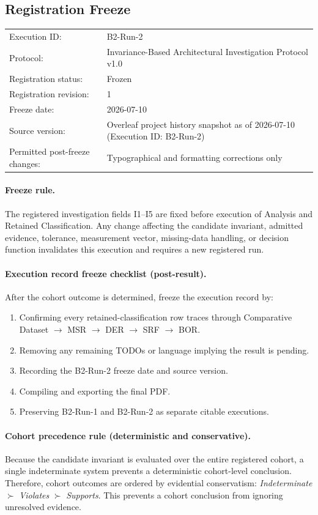 \subsection{Registration Freeze}
\label{sec:registration-freeze}
\begin{tabular}{@{}ll@{}}
\toprule
Execution ID: & B2-Run-2\\
Protocol: & Invariance-Based Architectural Investigation Protocol v1.0\\
Registration status: & Frozen\\
Registration revision: & 1\\
Freeze date: & 2026-07-10\\
Source version: & Overleaf project history snapshot as of 2026-07-10 (Execution ID: B2-Run-2)\\
Permitted post-freeze changes: & Typographical and formatting corrections only\\
\bottomrule
\end{tabular}

\paragraph{Freeze rule.}
The registered investigation fields I1--I5 are fixed before execution of
Analysis and Retained Classification. Any change affecting the candidate
invariant, admitted evidence, tolerance, measurement vector, missing-data
handling, or decision function invalidates this execution and requires a new
registered run.

\paragraph{Execution record freeze checklist (post-result).}
After the cohort outcome is determined, freeze the execution record by:
\begin{enumerate}
  \item Confirming every retained-classification row traces through Comparative Dataset $\rightarrow$ MSR $\rightarrow$ DER $\rightarrow$ SRF $\rightarrow$ BOR.
  \item Removing any remaining TODOs or language implying the result is pending.
  \item Recording the B2-Run-2 freeze date and source version.
  \item Compiling and exporting the final PDF.
  \item Preserving B2-Run-1 and B2-Run-2 as separate citable executions.
\end{enumerate}

\paragraph{Cohort precedence rule (deterministic and conservative).}
Because the candidate invariant is evaluated over the entire registered cohort,
a single indeterminate system prevents a deterministic cohort-level conclusion.
Therefore, cohort outcomes are ordered by evidential conservatism:
\textit{Indeterminate} $\succ$ \textit{Violates} $\succ$ \textit{Supports}.
This prevents a cohort conclusion from ignoring unresolved evidence.
